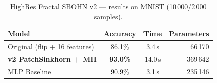 \begin{table}[h]
\centering
\caption{HighRes Fractal SBOHN v2 --- results on MNIST (10\,000/2\,000 samples).}
\begin{tabular}{lccr}
\hline
\textbf{Model} & \textbf{Accuracy} & \textbf{Time} & \textbf{Parameters} \\
\hline
Original (flip + 16 features)           & 86.1\%          & 3.4\,s  & 66\,170 \\
\textbf{v2 PatchSinkhorn + MH}      & \textbf{93.0\%} & 14.0\,s & 369\,642 \\
MLP Baseline                        & 90.9\%          & 3.1\,s  & 235\,146 \\
\hline
\end{tabular}
\end{table}
